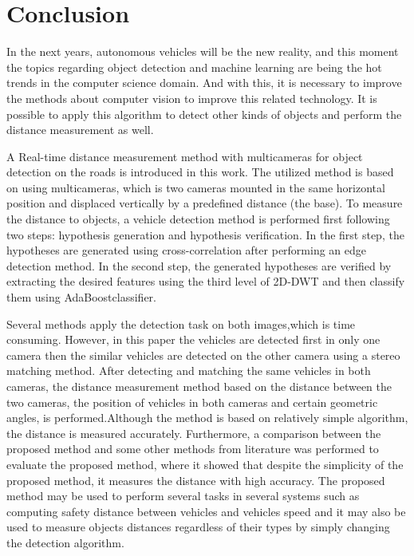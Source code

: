 \chapter{Conclusion}
\label{capitulo6}


In the next years, autonomous vehicles will be the new reality, and this moment the topics regarding object detection and machine learning are being the hot trends in the computer science domain. And with this, it is necessary to improve the methods about computer vision to improve this related technology. It is possible to apply this algorithm to detect other kinds of objects and perform the distance measurement as well. 

A Real-time distance measurement method with multicameras for object detection on the roads is introduced in this work. The utilized method is based on using multicameras, which is two cameras mounted in the same horizontal position and displaced vertically by a predefined distance (the base). To measure the distance to objects, a vehicle detection method is performed first following two steps: hypothesis generation and hypothesis verification. In the first step, the hypotheses are generated using cross-correlation after performing an edge detection method. In the second step, the generated hypotheses are verified by extracting the desired features using the third level of 2D-DWT and then classify them using AdaBoostclassifier. 

Several methods apply the detection task on both images,which is time consuming. However, in this paper the vehicles are detected first in only one camera then the similar vehicles are detected on the other camera using a stereo matching method. After detecting and matching the same vehicles in both cameras, the distance measurement method based on the distance between the two cameras, the position of vehicles in both cameras and certain geometric angles, is performed.Although the method is based on relatively simple algorithm, the distance is measured accurately. Furthermore, a comparison between the proposed method and some other methods from literature was performed to evaluate the proposed method, where it showed that despite the simplicity of the proposed method, it measures the distance with high accuracy. The proposed method may be used to perform several tasks in several systems such as computing safety distance between vehicles and vehicles speed and it may also be used to measure objects distances regardless of their types by simply changing the detection algorithm.

